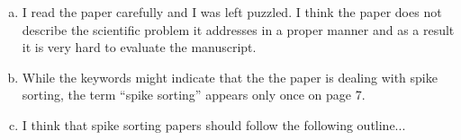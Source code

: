 
\begin{enumerate}[a.]
	
	\item I read the paper carefully and I was left puzzled. I think the paper does not describe the scientific problem it addresses in a proper manner and as a result it is very hard to evaluate the manuscript. 
	
	
	\item While the keywords might indicate that the the paper is dealing with spike sorting, the term “spike sorting” appears only once on page 7. 
	
	
	
	\item I think that spike sorting papers should follow the following outline...
	

\end{enumerate}
